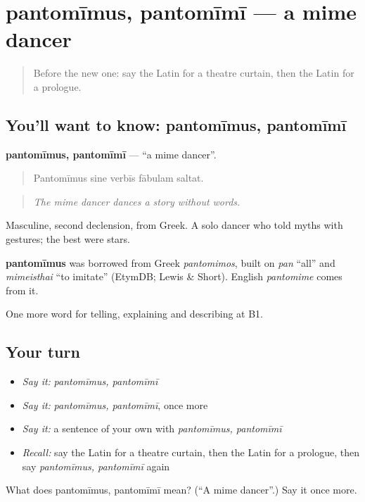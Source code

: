\section[pantomīmus, pantomīmī]{pantomīmus, pantomīmī — a mime dancer}

\label{lesson:LA-C546-pantomimus}



\begin{quote}
Before the new one: say the Latin for a theatre curtain, then the Latin for a prologue.
\end{quote}

\subsection*{You'll want to know: pantomīmus, pantomīmī}
\textbf{pantomīmus, pantomīmī} — \textquotedblleft{}a mime dancer\textquotedblright{}.

\begin{quote}
Pantomīmus sine verbīs fābulam saltat.
\end{quote}

\begin{quote}
\emph{The mime dancer dances a story without words.}
\end{quote}

Masculine, second declension, from Greek. A solo dancer who told myths with gestures; the best were stars.

\begin{cousinweb}
\textbf{pantomīmus} was borrowed from Greek \emph{pantomimos}, built on \emph{pan} \textquotedblleft{}all\textquotedblright{} and \emph{mimeisthai} \textquotedblleft{}to imitate\textquotedblright{} (EtymDB; Lewis \& Short). English \emph{pantomime} comes from it.
\end{cousinweb}

\begin{grammarlens}[title={What you've built}]
One more word for telling, explaining and describing at B1.
\end{grammarlens}

\subsection*{Your turn}
\begin{itemize}
\raggedright
  \item \emph{Say it:} \emph{pantomīmus, pantomīmī}
  \item \emph{Say it:} \emph{pantomīmus, pantomīmī}, once more
  \item \emph{Say it:} a sentence of your own with \emph{pantomīmus, pantomīmī}
  \item \emph{Recall:} say the Latin for a theatre curtain, then the Latin for a prologue, then say \emph{pantomīmus, pantomīmī} again
\end{itemize}

\begin{tcolorbox}[breakable,colback=teal!4,colframe=teal!35!black,title={Before you move on}]
What does pantomīmus, pantomīmī mean? (\textquotedblleft{}A mime dancer\textquotedblright{}.) Say it once more.
\end{tcolorbox}
